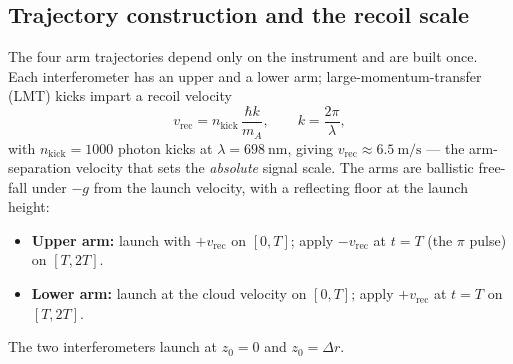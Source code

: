 \documentclass[11pt,a4paper]{article}
\theoremstyle{reqstyle}
\begin{document}
\subsection{Trajectory construction and the recoil scale}
\label{sec:traj}
The four arm trajectories depend only on the instrument and are built once. Each
interferometer has an upper and a lower arm; large-momentum-transfer (LMT) kicks impart a
recoil velocity
\begin{equation}
v_{\mathrm{rec}} = n_{\mathrm{kick}}\,\frac{\hbar k}{m_A},
\qquad k = \frac{2\pi}{\lambda},
\label{eq:recoil}
\end{equation}
with $n_{\mathrm{kick}}=1000$ photon kicks at $\lambda=\SI{698}{\nano\metre}$, giving
$v_{\mathrm{rec}}\approx\SI{6.5}{\metre\per\second}$ --- the arm-separation velocity that
sets the \emph{absolute} signal scale. The arms are ballistic free-fall under $-g$ from the
launch velocity, with a reflecting floor at the launch height:
\begin{itemize}[leftmargin=*,nosep]
\item \textbf{Upper arm:} launch with $+v_{\mathrm{rec}}$ on $[0,T]$; apply $-v_{\mathrm{rec}}$
at $t=T$ (the $\pi$ pulse) on $[T,2T]$.
\item \textbf{Lower arm:} launch at the cloud velocity on $[0,T]$; apply $+v_{\mathrm{rec}}$
at $t=T$ on $[T,2T]$.
\end{itemize}
The two interferometers launch at $z_0 = 0$ and $z_0 = \Delta r$.
\end{document}
